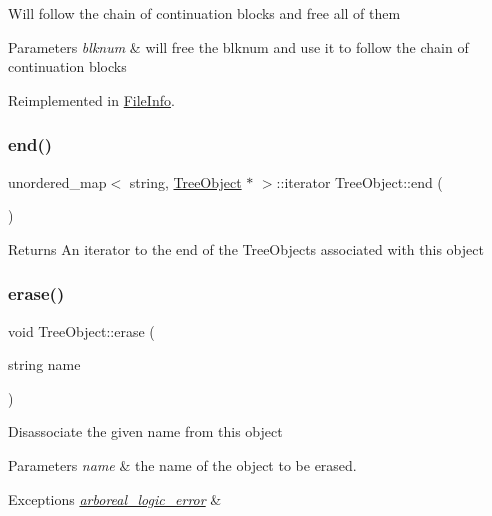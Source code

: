 Will follow the chain of continuation blocks and free all of them 
\begin{DoxyParams}{Parameters}
{\em blknum} & will free the blknum and use it to follow the chain of continuation blocks \\
\hline
\end{DoxyParams}


Reimplemented in \mbox{\hyperlink{class_file_info_a8c6b58cb9f7e9978064291ef81380e01}{File\+Info}}.

\mbox{\label{class_tree_object_a2544e2976f3b75cd1f0230f5f908059c}} 
\subsubsection{\texorpdfstring{end()}{end()}}
{\footnotesize\ttfamily unordered\+\_\+map$<$ string, \mbox{\hyperlink{class_tree_object}{Tree\+Object}} $\ast$ $>$\+::iterator Tree\+Object\+::end (\begin{DoxyParamCaption}{ }\end{DoxyParamCaption})}

\begin{DoxyReturn}{Returns}
An iterator to the end of the Tree\+Objects associated with this object 
\end{DoxyReturn}
\mbox{\label{class_tree_object_a453b5df2a9ef7c6faad259900d574ee2}} 
\subsubsection{\texorpdfstring{erase()}{erase()}}
{\footnotesize\ttfamily void Tree\+Object\+::erase (\begin{DoxyParamCaption}\item[{string}]{name }\end{DoxyParamCaption})\hspace{0.3cm}{\ttfamily [virtual]}}

Disassociate the given name from this object 
\begin{DoxyParams}{Parameters}
{\em name} & the name of the object to be erased. \\
\hline
\end{DoxyParams}

\begin{DoxyExceptions}{Exceptions}
{\em \mbox{\hyperlink{classarboreal__logic__error}{arboreal\+\_\+logic\+\_\+error}}} & \\
\hline
\end{DoxyExceptions}


